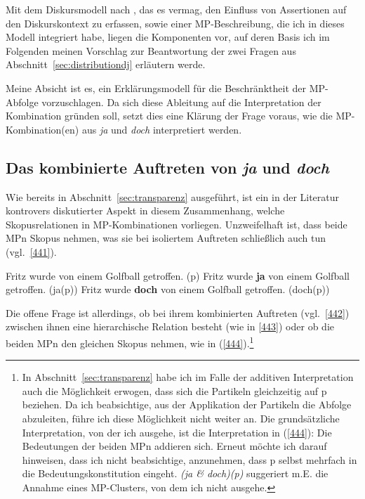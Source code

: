 Mit dem Diskursmodell nach \citet{Farkas2010}, das es vermag, den Einfluss von Assertionen auf den Diskurskontext zu erfassen, sowie einer MP-Be\-schrei\-bung, die ich in dieses Modell integriert habe, liegen die Komponenten vor, auf deren Basis ich im Folgenden meinen Vorschlag zur Beantwortung der zwei Fragen aus Abschnitt~\ref{sec:distributiondj} erläutern werde.\largerpage[2]

Meine Absicht ist es, ein Erklärungsmodell für die Beschränktheit der MP-Abfolge vorzuschlagen. Da sich diese Ableitung auf die Interpretation der Kombination gründen soll, setzt dies eine Klärung der Frage voraus, wie die MP-Kombination(en) aus \textit{ja} und \textit{doch} interpretiert werden. 	

\subsection{Das kombinierte Auftreten von \textit{ja} und \textit{doch}}
\label{sec:kombi}
Wie bereits in Abschnitt~\ref{sec:transparenz} ausgeführt, ist ein in der Literatur kontrovers diskutierter Aspekt in diesem Zusammenhang, welche Skopusrelationen  in MP-Kombi\-nationen vorliegen. Unzweifelhaft ist, dass beide MPn Skopus nehmen, was sie bei isoliertem Auftreten schließlich auch tun (vgl.\ \ref{441}).\largerpage[1.5]

\begin{exe}
	\ex\label{441} 
	\begin{xlist}
		\ex\label{441a} Fritz wurde von einem Golfball getroffen. (p)	
 		\ex\label{441b}	Fritz wurde \textbf{ja} von einem Golfball getroffen. (ja(p))		
		\ex\label{441c}	Fritz wurde \textbf{doch} von einem Golfball getroffen. (doch(p))	
 	\end{xlist}	
\end{exe}
Die offene Frage ist allerdings, ob bei ihrem kombinierten Auftreten (vgl.\ \ref{442}) zwischen ihnen eine hierarchische Relation besteht (wie in \ref{443}) oder ob die beiden MPn den gleichen Skopus nehmen, wie in (\ref{444}).\footnote{In Abschnitt~\ref{sec:transparenz} habe ich im Falle der additiven Interpretation auch die Möglichkeit erwogen, dass sich die Partikeln gleichzeitig auf p beziehen. Da ich beabsichtige, aus der Applikation der Partikeln die Abfolge abzuleiten, führe ich diese Möglichkeit nicht weiter an. Die grund\-sätzliche Interpretation, von der ich ausgehe, ist die Interpretation in (\ref{444}): Die Bedeutungen der beiden MPn addieren sich. Erneut möchte ich darauf hinweisen, dass ich nicht beabsichtige, anzunehmen, dass p selbst mehrfach in die Bedeutungskonstitution eingeht. \textit{(ja \& doch)(p)} suggeriert m.E. die Annahme eines MP-Clusters, von dem ich nicht ausgehe.}

